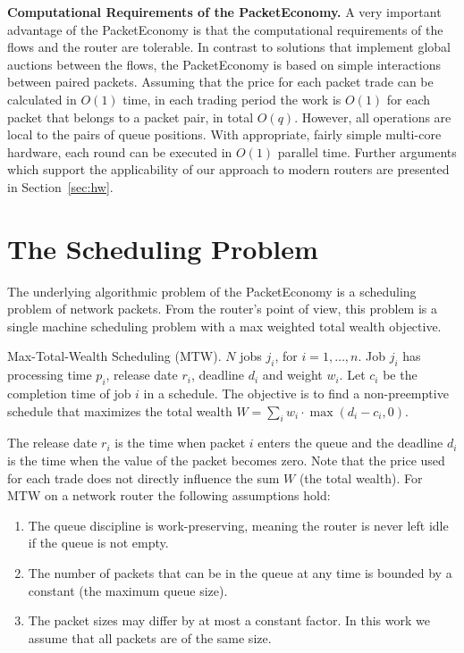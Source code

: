\documentclass[letterpaper,10pt]{llncs}
\begin{document}
\noindent
{\bf Computational Requirements of the PacketEconomy.}
A very important advantage of the PacketEconomy is that the computational
requirements of the flows and the router are tolerable.
In contrast to solutions that implement global auctions between the flows,
the PacketEconomy is based on simple interactions between paired packets.
Assuming that the price for each packet trade can be calculated in $O(1)$ time, 
in each trading period the work is $O(1)$ for each packet 
that belongs to a packet pair, in total $O(q)$.
However, all operations are local to the pairs of queue positions.
With appropriate, fairly simple multi-core hardware, each round can be 
executed in $O(1)$ parallel time. Further arguments which support the 
applicability of our approach to modern routers are presented in 
Section~\ref{sec:hw}.

\section{The Scheduling Problem}
\label{sec:sched}

The underlying algorithmic problem of the PacketEconomy is a scheduling problem of network packets.
From the router's point of view, this problem is a single machine scheduling problem with a max 
weighted total wealth objective.

\begin{definition} Max-Total-Wealth Scheduling (MTW).
$N$ jobs $j_i$, for $i=1,\dots,n$. Job $j_i$ has processing time $p_i$, release date $r_i$,
deadline $d_i$ and weight $w_i$. Let $c_i$ be the completion time of job $i$ in a schedule.
The objective is to find a non-preemptive schedule that maximizes the total wealth $W = \sum_i w_i \cdot \max(d_i - c_i, 0)$.
\end{definition}

\noindent
The release date $r_i$ is the time when packet $i$ enters the queue
and the deadline $d_i$ is the time when the value of the packet becomes zero.
Note that the price used for each trade does not directly influence the sum $W$ (the total wealth).
For MTW on a network router the following assumptions hold:
\begin{enumerate}
\item The queue discipline is work-preserving, meaning the router is never left idle if the queue is not empty.
\item The number of packets that can be in the queue at any time is bounded by a constant (the maximum queue size). 
\item The packet sizes may differ by at most a constant factor. In this work we assume that all packets are of the same size.
\end{enumerate}
\end{document}
